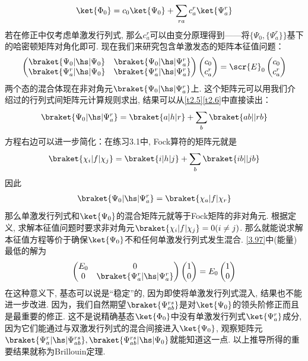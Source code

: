 \begin{align}
	\ket{\Phi_0} = c_0\ket{\Psi_0} + \sum_{ra}c_a^r\ket{\Psi_a^r}
\end{align}
若在修正中仅考虑单激发行列式, 
那么$c_a^r$可以由变分原理得到——将$\{\Psi_0,\{\Psi_a^r\}\}$基下的哈密顿矩阵对角化即可. 
现在我们来研究包含单激发态的矩阵本征值问题：
\begin{align}
	\label{3.97}
	\begin{pmatrix}
		\braket{\Psi_0|\hs|\Psi_0}   & \braket{\Psi_0|\hs|\Psi_a^r}   \\
		\braket{\Psi_a^r|\hs|\Psi_0} & \braket{\Psi_a^r|\hs|\Psi_a^r}
	\end{pmatrix}
	\begin{pmatrix}
		c_0\\
		c_a^r
	\end{pmatrix}
	=\scr{E}_0
	\begin{pmatrix}
		c_0\\
		c_a^r
	\end{pmatrix}
\end{align}
两个态的混合体现在非对角元$\braket{\Psi_0|\hs|\Psi_a^r}$上. 
这个矩阵元可以用我们介绍过的行列式间矩阵元计算规则求出, 
结果可以从\autoref{t2.5}\autoref{t2.6}中直接读出：
\begin{align}
	\braket{\Psi_0|\hs|\Psi_a^r} = \braket{a|h|r} + \sum_b\braket{ab||rb}
\end{align}
方程右边可以进一步简化：在练习3.1中, 
Fock算符的矩阵元就是
\begin{align}
	\braket{\chi_i|f|\chi_j} = \braket{i|h|j} + \sum_b\braket{ib||jb}
\end{align} 
因此
\begin{align}
	\braket{\Psi_0|\hs|\Psi_a^r} = \braket{\chi_a|f|\chi_r}
\end{align}
那么单激发行列式和$\ket{\Psi_0}$的混合矩阵元就等于Fock矩阵的非对角元.
根据定义, 
求解\hft 本征值问题时要求非对角元$\braket{\chi_i|f|\chi_j}=0(i\neq j)$. 
那么就能说求解\hft 本征值方程等价于确保$\ket{\Psi_0}$不和任何单激发行列式发生混合. 
\autoref{3.97}中(能量)最低的解为
\begin{align}
	\begin{pmatrix}
		E_0 & 0\\
		0   & \braket{\Psi_a^r|\hs|\Psi_a^r}
	\end{pmatrix}
	\begin{pmatrix}
		1\\0
	\end{pmatrix}
	=E_0
	\begin{pmatrix}
		1\\0
	\end{pmatrix}
\end{align}
在这种意义下, 
\hft 基态可以说是“稳定”的, 
因为即使将单激发行列式混入, 
结果也不能进一步改进. 
因为，我们自然期望$\braket{\Psi_{ab}^{rs}}$是对$\ket{\Psi_0}$的领头阶修正而且是最重要的修正. 
这不是说精确基态$\ket{\Phi_0}$中没有单激发行列式$\ket{\Psi_a^r}$成分, 
因为它们能通过与双激发行列式的混合间接进入$\ket{\Psi_0}$, 
观察矩阵元$\braket{\Psi_a^r|\hs|\Psi_{ab}^{rs}},\braket{\Psi_{ab}^{rs}|\hs|\Psi_0}$就能知道这一点. 
以上推导所得的重要结果就称为Brillouin定理. 


